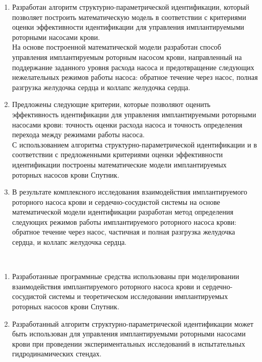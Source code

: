 \newpage
\novelty
\begin{enumerate}
  \item Разработан алгоритм структурно-параметрической идентификации, который позволяет построить математическую модель в соответствии с критериями оценки эффективности идентификации для управления имплантируемыми роторными насосами крови. \\На основе построенной математической модели разработан способ управления имплантируемым роторным насосом крови, направленный на поддержание заданного уровня расхода насоса и предотвращение следующих нежелательных режимов работы насоса: обратное течение через насос, полная разгрузка желудочка сердца и коллапс желудочка сердца.
  \item Предложены следующие критерии, которые позволяют оценить эффективность идентификации для управления имплантируемыми роторными насосами крови: точность оценки расхода насоса и точность определения перехода между режимами работы насоса. \\С использованием алгоритма структурно-параметрической идентификации и в соответствии с предложенными критериями оценки эффективности идентификации построены математические модели имплантируемых роторных насосов крови Спутник.
  \item В результате комплексного исследования взаимодействия имплантируемого роторного насоса крови и сердечно-сосудистой системы на основе математической модели идентификации разработан метод определения следующих режимов работы имплантируемого роторного насоса крови: обратное течение через насос, частичная и полная разгрузка желудочка сердца, и коллапс желудочка сердца.
\end{enumerate}


\influence\ 
\begin{enumerate}
 \item Разработанные программные средства использованы при моделировании взаимодействия имплантируемого роторного насоса крови и сердечно-сосудистой системы и теоретическом исследовании имплантируемых роторных насосов крови Спутник. 
 \item Разработанный алгоритм структурно-параметрической идентификации может быть использован для управления имплантируемыми роторными насосами крови при проведении экспериментальных исследований в испытательных гидродинамических стендах. %
\end{enumerate}

